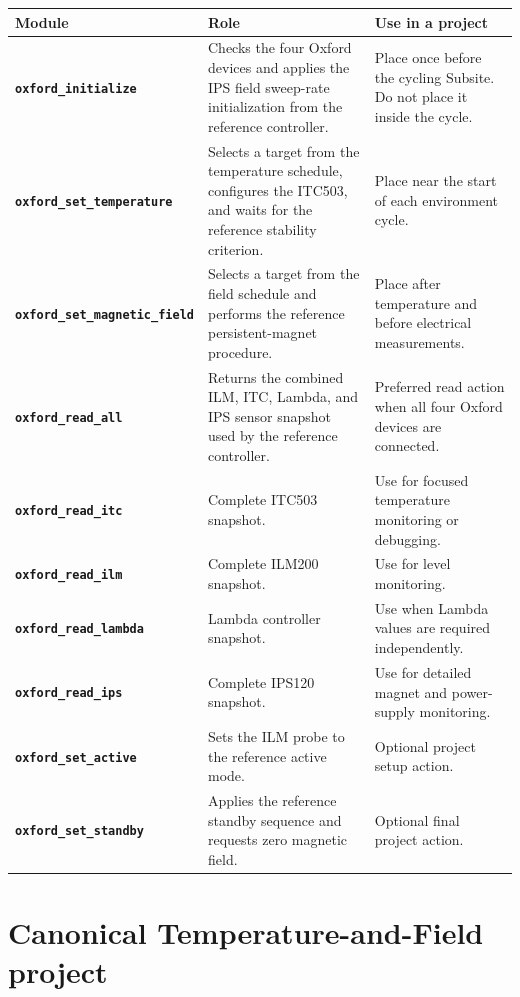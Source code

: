 \documentclass[10pt,a4paper]{article}
\newcommand{\api}[1]{\nolinkurl{#1}}
\newcommand{\module}[1]{\textcolor{OxfordBlue}{\textbf{\api{#1}}}}
\begin{document}
\begin{longtable}{@{}>{\raggedright\arraybackslash}p{}
                        >{\raggedright\arraybackslash}p{}
                        >{\raggedright\arraybackslash}p{}@{}}
\toprule
\textbf{Module} & \textbf{Role} & \textbf{Use in a project} \\
\midrule
\endhead
\module{oxford_initialize} &
Checks the four Oxford devices and applies the IPS field sweep-rate initialization from the reference controller. &
Place once before the cycling Subsite. Do not place it inside the cycle. \\
\addlinespace
\module{oxford_set_temperature} &
Selects a target from the temperature schedule, configures the ITC503, and waits for the reference stability criterion. &
Place near the start of each environment cycle. \\
\addlinespace
\module{oxford_set_magnetic_field} &
Selects a target from the field schedule and performs the reference persistent-magnet procedure. &
Place after temperature and before electrical measurements. \\
\addlinespace
\module{oxford_read_all} &
Returns the combined ILM, ITC, Lambda, and IPS sensor snapshot used by the reference controller. &
Preferred read action when all four Oxford devices are connected. \\
\addlinespace
\module{oxford_read_itc} & Complete ITC503 snapshot. &
Use for focused temperature monitoring or debugging. \\
\addlinespace
\module{oxford_read_ilm} & Complete ILM200 snapshot. &
Use for level monitoring. \\
\addlinespace
\module{oxford_read_lambda} & Lambda controller snapshot. &
Use when Lambda values are required independently. \\
\addlinespace
\module{oxford_read_ips} & Complete IPS120 snapshot. &
Use for detailed magnet and power-supply monitoring. \\
\addlinespace
\module{oxford_set_active} & Sets the ILM probe to the reference active mode. &
Optional project setup action. \\
\addlinespace
\module{oxford_set_standby} & Applies the reference standby sequence and requests zero magnetic field. &
Optional final project action. \\
\bottomrule
\end{longtable}

\section{Canonical Temperature-and-Field project}
\end{document}
